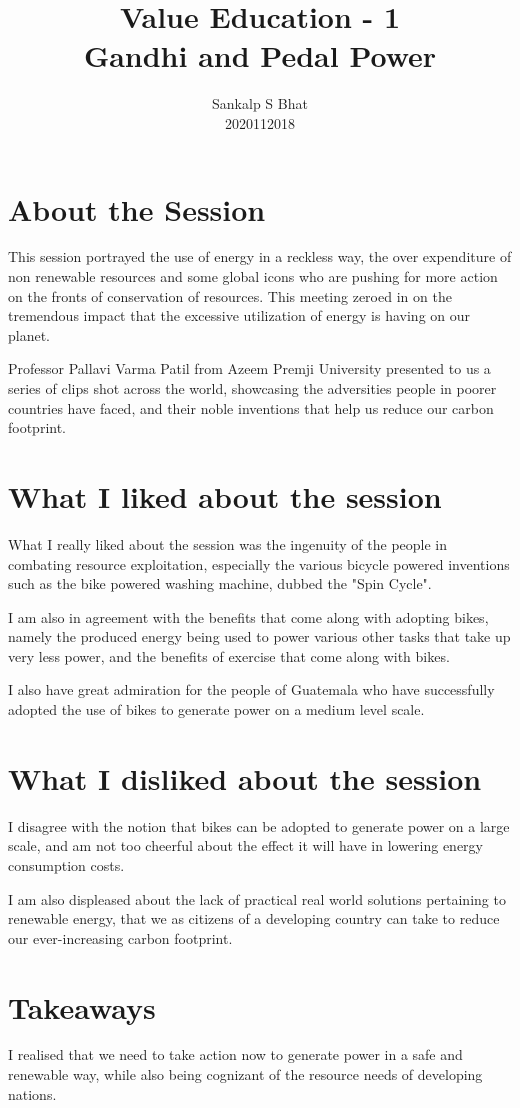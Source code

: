 \documentclass[a4paper, 12pt]{extarticle}
\title{Value Education - 1\\
Gandhi and Pedal Power
}
\author{Sankalp S Bhat\\
2020112018
}
\begin{document}
\maketitle
\thispagestyle{empty}

\section*{About the Session}
This session portrayed the use of energy in a reckless way, the over expenditure of non renewable resources and some global icons who are pushing for more action on the fronts of conservation of resources. This meeting zeroed in on the tremendous impact that the excessive utilization of energy is having on our planet. 

Professor Pallavi Varma Patil from Azeem Premji University presented to us a series of clips shot across the world, showcasing the adversities people in poorer countries have faced, and their noble inventions that help us reduce our carbon footprint. 
      
\section*{What I liked about the session}

What I really liked about the session was the ingenuity of the people in combating resource exploitation, especially the various bicycle powered inventions such as the bike powered washing machine, dubbed the "Spin Cycle".
    
I am also in agreement with the benefits that come along with adopting bikes, namely the produced energy being used to power various other tasks that take up very less power, and the benefits of exercise that come along with bikes.

I also have great admiration for the people of Guatemala who have successfully adopted the use of bikes to generate power on a medium level scale.
     
 \section*{What I disliked about the session}
 
I disagree with the notion that bikes can be adopted to generate power on a large scale, and am not too cheerful about the effect it will have in lowering energy consumption costs.

I am also displeased about the lack of practical real world solutions pertaining to renewable energy, that we as citizens of a developing country can take to reduce our ever-increasing carbon footprint.

 \section*{Takeaways}
    
I realised that we need to take action now to generate power in a safe and renewable way, while also being cognizant of the resource needs of developing nations.
\end{document}
